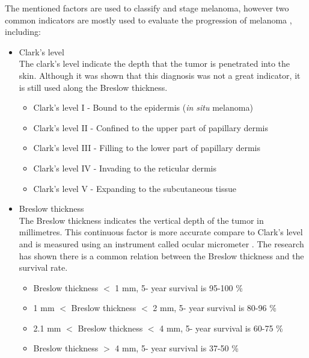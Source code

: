 The mentioned factors are used to classify and stage melanoma, however two common indicators are mostly used to evaluate the progression of melanoma \cite{balch2009final}, including: 

	\begin{itemize}
	\item Clark's level\\
	The clark's level indicate the depth that the tumor is penetrated into the skin. Although it was shown that this diagnosis was not a great indicator, it is still used along the Breslow thickness. 
		\begin{itemize}
		\item Clark's level I - Bound to the epidermis (\textit{in situ} melanoma)
		\item Clark's level II - Confined to the upper part of papillary dermis 
		\item Clark's level III - Filling to the lower part of papillary dermis
		\item Clark's level IV - Invading to the reticular dermis
		\item Clark's level V - Expanding to the subcutaneous tissue
		\end{itemize}	
	
	\item Breslow thickness\\
The Breslow thickness indicates the vertical depth of the tumor in millimetres. This continuous factor is more accurate compare to Clark's level and is measured using an instrument called ocular micrometer \cite{balch2009final}. 
The research has shown there is a common relation between the Breslow thickness and the survival rate. 
		\begin{itemize}
		\item Breslow thickness $<$ 1 mm, 5- year survival is 95-100 \%
		\item 1 mm $<$ Breslow thickness $<$ 2 mm, 5- year survival is 80-96 \% 
		\item 2.1 mm $<$ Breslow thickness $<$ 4 mm, 5- year survival is 60-75 \%
		\item Breslow thickness $>$ 4 mm, 5- year survival is  37-50 \%
		\end{itemize}
	\end{itemize}

